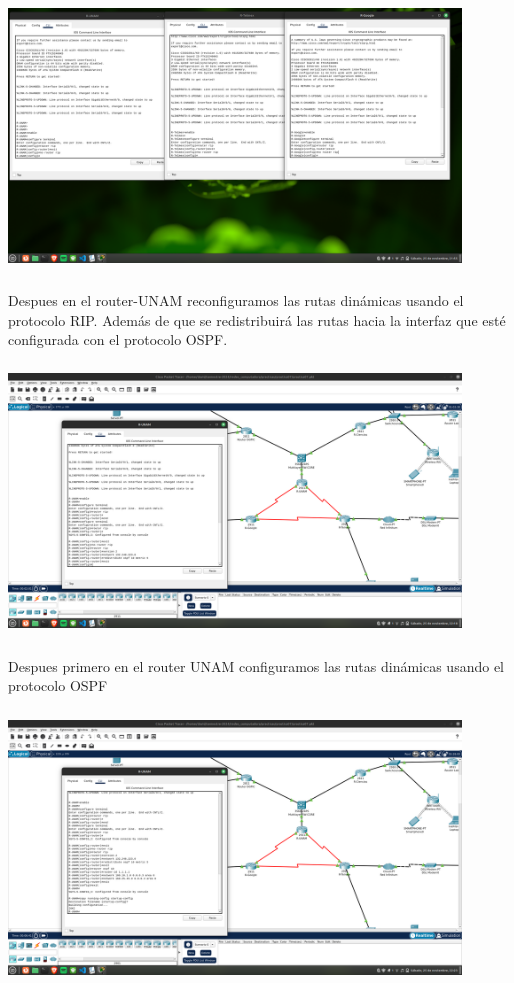 \documentclass[14pt]{book}
\begin{document}
\includegraphics[width=12cm, height=8cm]{images/no router rip.png}\\

Despues en el router-UNAM reconfiguramos las rutas dinámicas
usando el protocolo RIP. Además de que se redistribuirá las rutas hacia la interfaz que esté
configurada con el protocolo OSPF.\\

\includegraphics[width=12cm, height=8cm]{images/configuracion unam 2.png}\\

Despues primero en el router UNAM configuramos las rutas dinámicas
usando el protocolo OSPF\\

\includegraphics[width=12cm, height=8cm]{images/configutacion general 1.png}\\
\end{document}
